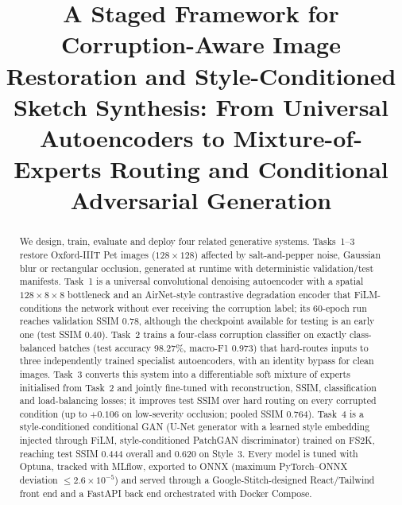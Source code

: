 \documentclass[conference]{IEEEtran}
\begin{document}
\title{A Staged Framework for Corruption-Aware Image Restoration and Style-Conditioned Sketch Synthesis: From Universal Autoencoders to Mixture-of-Experts Routing and Conditional Adversarial Generation}

\author{
}

\maketitle

\begin{abstract}
We design, train, evaluate and deploy four related generative systems. Tasks~1--3 restore Oxford-IIIT Pet images ($128{\times}128$) affected by salt-and-pepper noise, Gaussian blur or rectangular occlusion, generated at runtime with deterministic validation/test manifests. Task~1 is a universal convolutional denoising autoencoder with a spatial $128{\times}8{\times}8$ bottleneck and an AirNet-style contrastive degradation encoder that FiLM-conditions the network without ever receiving the corruption label; its 60-epoch run reaches validation SSIM 0.78, although the checkpoint available for testing is an early one (test SSIM 0.40). Task~2 trains a four-class corruption classifier on exactly class-balanced batches (test accuracy 98.27\%, macro-F1 0.973) that hard-routes inputs to three independently trained specialist autoencoders, with an identity bypass for clean images. Task~3 converts this system into a differentiable soft mixture of experts initialised from Task~2 and jointly fine-tuned with reconstruction, SSIM, classification and load-balancing losses; it improves test SSIM over hard routing on every corrupted condition (up to $+0.106$ on low-severity occlusion; pooled SSIM 0.764). Task~4 is a style-conditioned conditional GAN (U-Net generator with a learned style embedding injected through FiLM, style-conditioned PatchGAN discriminator) trained on FS2K, reaching test SSIM 0.444 overall and 0.620 on Style~3. Every model is tuned with Optuna, tracked with MLflow, exported to ONNX (maximum PyTorch--ONNX deviation $\le 2.6{\times}10^{-5}$) and served through a Google-Stitch-designed React/Tailwind front end and a FastAPI back end orchestrated with Docker Compose.
\end{abstract}
\end{document}
